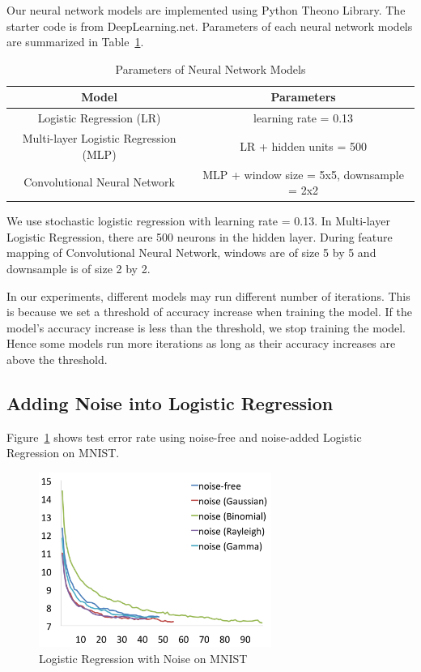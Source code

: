 Our neural network models are implemented using Python Theono Library. The
starter code is from DeepLearning.net. Parameters of each neural
network models are summarized in Table~\ref{params}.
\vspace{-7pt}
\begin{table}[!htbp]
\centering
\begin{tabular}{| c | c |}
\hline
Model & Parameters \\
\hline
Logistic Regression (LR) & learning rate = 0.13 \\
Multi-layer Logistic Regression (MLP) & LR + hidden units = 500 \\
Convolutional Neural Network & MLP + window size = 5x5, downsample = 2x2\\
\hline
\end{tabular}
\caption{Parameters of Neural Network Models}
\label{params}
\end{table}

We use stochastic logistic regression with learning rate = 0.13.
In Multi-layer Logistic Regression, there are 500 neurons in the hidden
layer. During feature mapping of Convolutional Neural Network, windows
are of size 5 by 5 and downsample is of size 2 by 2.

In our experiments, different models may run different number of
iterations. This is because we set a threshold of accuracy increase when
training the model. If the model's accuracy increase is less than the
threshold, we stop training the model. Hence some models run more
iterations as long as their accuracy increases are above the threshold.

\subsection{Adding Noise into Logistic Regression}
Figure~\ref{logistic} shows test error rate using noise-free and
noise-added Logistic Regression on MNIST.
\begin{figure}[!htbp]
\centering
\includegraphics[width=215pt]{f-figs/logistic.png}
\caption{Logistic Regression with Noise on MNIST}
\label{logistic}
\end{figure}

